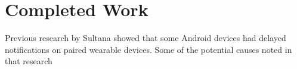 \section{Completed Work}
Previous research by Sultana\cite{sultana_wearable_nodate} showed that some Android devices had delayed notifications on paired wearable devices. 
Some of the potential causes noted in that research  